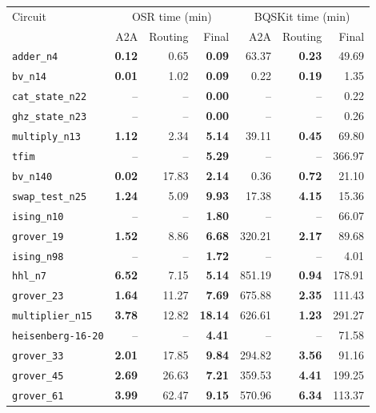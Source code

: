 \begin{table}[p]
\centering
\scriptsize
\begin{tabular}{l|rrr|rrr}
\hline
Circuit & \multicolumn{3}{c|}{OSR time (min)} & \multicolumn{3}{c}{BQSKit time (min)} \\
 & A2A & Routing & Final & A2A & Routing & Final \\
\hline
\texttt{adder\_n4} & \textbf{0.12} & 0.65 & \textbf{0.09} & 63.37 & \textbf{0.23} & 49.69 \\
\texttt{bv\_n14} & \textbf{0.01} & 1.02 & \textbf{0.09} & 0.22 & \textbf{0.19} & 1.35 \\
\texttt{cat\_state\_n22} & -- & -- & \textbf{0.00} & -- & -- & 0.22 \\
\texttt{ghz\_state\_n23} & -- & -- & \textbf{0.00} & -- & -- & 0.26 \\
\texttt{multiply\_n13} & \textbf{1.12} & 2.34 & \textbf{5.14} & 39.11 & \textbf{0.45} & 69.80 \\
\texttt{tfim} & -- & -- & \textbf{5.29} & -- & -- & 366.97 \\
\texttt{bv\_n140} & \textbf{0.02} & 17.83 & \textbf{2.14} & 0.36 & \textbf{0.72} & 21.10 \\
\texttt{swap\_test\_n25} & \textbf{1.24} & 5.09 & \textbf{9.93} & 17.38 & \textbf{4.15} & 15.36 \\
\texttt{ising\_n10} & -- & -- & \textbf{1.80} & -- & -- & 66.07 \\
\texttt{grover\_19} & \textbf{1.52} & 8.86 & \textbf{6.68} & 320.21 & \textbf{2.17} & 89.68 \\
\texttt{ising\_n98} & -- & -- & \textbf{1.72} & -- & -- & 4.01 \\
\texttt{hhl\_n7} & \textbf{6.52} & 7.15 & \textbf{5.14} & 851.19 & \textbf{0.94} & 178.91 \\
\texttt{grover\_23} & \textbf{1.64} & 11.27 & \textbf{7.69} & 675.88 & \textbf{2.35} & 111.43 \\
\texttt{multiplier\_n15} & \textbf{3.78} & 12.82 & \textbf{18.14} & 626.61 & \textbf{1.23} & 291.27 \\
\texttt{heisenberg-16-20} & -- & -- & \textbf{4.41} & -- & -- & 71.58 \\
\texttt{grover\_33} & \textbf{2.01} & 17.85 & \textbf{9.84} & 294.82 & \textbf{3.56} & 91.16 \\
\texttt{grover\_45} & \textbf{2.69} & 26.63 & \textbf{7.21} & 359.53 & \textbf{4.41} & 199.25 \\
\texttt{grover\_61} & \textbf{3.99} & 62.47 & \textbf{9.15} & 570.96 & \textbf{6.34} & 113.37 \\

\end{tabular}
\end{table}
